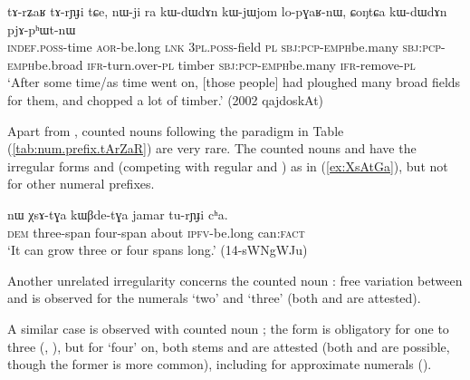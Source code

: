 \begin{exe}
\ex \label{ex:tArZaR.tArYJi}
\gll tɤ-rʑaʁ tɤ-rɲɟi tɕe, nɯ-ji ra kɯ-dɯ\redp{}dɤn kɯ-jɯ\redp{}jom lo-pɣaʁ-nɯ, ɕoŋtɕa kɯ-dɯ\redp{}dɤn pjɤ-pʰɯt-nɯ \\
\textsc{indef}.\textsc{poss}-time \textsc{aor}-be.long \textsc{lnk} \textsc{3pl}.\textsc{poss}-field \textsc{pl} \textsc{sbj}:\textsc{pcp}-\textsc{emph}\redp{}be.many \textsc{sbj}:\textsc{pcp}-\textsc{emph}\redp{}be.broad \textsc{ifr}-turn.over-\textsc{pl} timber \textsc{sbj}:\textsc{pcp}-\textsc{emph}\redp{}be.many \textsc{ifr}-remove-\textsc{pl} \\
\glt `After some time/as time went on, [those people] had ploughed many broad fields for them, and chopped a lot of timber.' (2002 qajdoskAt)
\end{exe}

Apart from  , counted nouns following the paradigm in Table (\ref{tab:num.prefix.tArZaR}) are very rare. The counted nouns  and  have the irregular forms  and  (competing with regular  and ) as in (\ref{ex:XsAtGa}), but not for other numeral prefixes. 

\begin{exe}
\ex \label{ex:XsAtGa}
\gll nɯ χsɤ-tɣa kɯβde-tɣa jamar tu-rɲɟi cʰa. \\
\textsc{dem} three-span four-span about \textsc{ipfv}-be.long can:\textsc{fact} \\
\glt `It can grow three or four spans long.' (14-sWNgWJu) 
\end{exe}

Another unrelated irregularity concerns the counted noun : free variation between  and  is observed for the numerals `two' and `three' (both  and  are attested).

A similar case is observed with counted noun ; the form  is obligatory for one to three (, ), but for `four' on, both stems  and  are attested (both  and  are possible, though the former is more common), including for approximate numerals ().  

